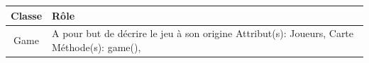 \begin{tabularx}{15 cm}{|c|X|}
\hline
Classe & Rôle \\
\hline
Game & A pour but de décrire le jeu à son origine \newline Attribut(s): Joueurs, Carte \newline Méthode(s): game(),\\ 

\end{tabularx}







